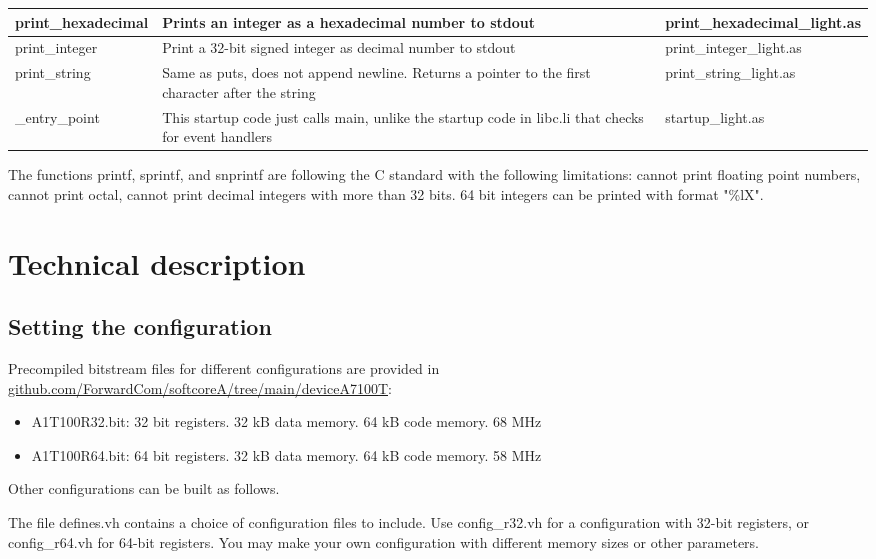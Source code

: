 \documentclass[11pt,a4paper,oneside,openright]{report}
\newcommand{\vv}{ \vspace{2mm} }   %
\begin{document}
\begin{tabular}{|p{25mm}|p{100mm}|p{30mm}|}
print\_hexadecimal  & Prints an integer as a hexadecimal number to stdout & print\_hexadecimal\_light.as \\ \hline

print\_integer & Print a 32-bit signed integer as decimal number to stdout & print\_integer\_light.as \\ \hline

print\_string  & Same as puts, does not append newline. Returns a pointer to the first character after the string & print\_string\_light.as \\ \hline

\_entry\_point & This startup code just calls main, unlike the startup code in libc.li that checks for event handlers & startup\_light.as  \\ \hline

\end{tabular}
\vv

The functions printf, sprintf, and snprintf are following the C standard with the following limitations: cannot print floating point numbers, cannot print octal, cannot print decimal integers with more than 32 bits. 64 bit integers can be printed with format "\%lX".
\vv


\chapter{Technical description}

\section{Setting the configuration} \label{SettingConfiguration}
Precompiled bitstream files for different configurations are provided in \\

\href{https://github.com/ForwardCom/softcoreA/tree/main/deviceA7100T}{github.com/ForwardCom/softcoreA/tree/main/deviceA7100T}:
\begin{itemize}
\item A1T100R32.bit: 32 bit registers. 32 kB data memory. 64 kB code memory. 68 MHz
\item A1T100R64.bit: 64 bit registers. 32 kB data memory. 64 kB code memory. 58 MHz
\end{itemize}
\vv

Other configurations can be built as follows.
\vv

The file defines.vh contains a choice of configuration files to include. 
Use config\_r32.vh for a configuration with 32-bit registers, or config\_r64.vh for 64-bit registers. You may make your own configuration with different memory sizes or other parameters. 
\vv
\end{document}
